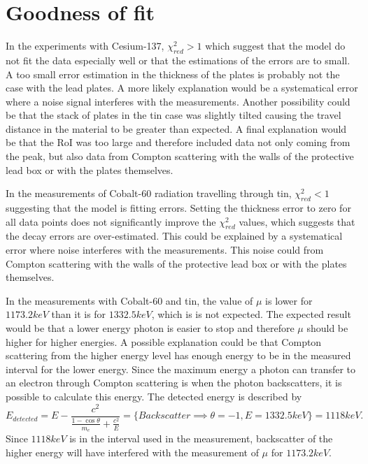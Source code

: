 \documentclass[12pt]{report}
\begin{document}
\section{Goodness of fit}
In the experiments with Cesium-137, $\chi^2_{red} > 1$ which suggest that the model do not fit the data especially well or that the estimations of the errors are to small. A too small error estimation in the thickness of the plates is probably not the case with the lead plates. A more likely explanation would be a systematical error where a noise signal interferes with the measurements. Another possibility could be that the stack of plates in the tin case was slightly tilted causing the travel distance in the material to be greater than expected. A final explanation would be that the RoI was too large and therefore included data not only coming from the peak, but also data from Compton scattering with the walls of the protective lead box or with the plates themselves.

In the measurements of Cobalt-60 radiation travelling through tin, $\chi^2_{red} < 1$ suggesting that the model is fitting errors. Setting the thickness error to zero for all data points does not significantly improve the $\chi^2_{red}$ values, which suggests that the decay errors are over-estimated. This could be explained by a systematical error where noise interferes with the measurements. This noise could from Compton scattering with the walls of the protective lead box or with the plates themselves.

\newpage
In the measurements with Cobalt-60 and tin, the value of $\mu$ is lower for $1173.2keV$ than it is for $1332.5keV$, which is is not expected. The expected result would be that a lower energy photon is easier to stop and therefore $\mu$ should be higher for higher energies. A possible explanation could be that Compton scattering from the higher energy level has enough energy to be in the measured interval for the lower energy. Since the maximum energy a photon can transfer to an electron through Compton scattering is when the photon backscatters, it is possible to calculate this energy. The detected energy is described by
\begin{equation}
    E_{detected} = E - \frac{c^2}{\frac{1 - \cos{\theta}}{m_e} + \frac{c^2}{E}} = \{Backscatter \implies \theta = -1, E = 1332.5keV\} = 1118 keV.
\end{equation}
Since $1118keV$ is in the interval used in the measurement, backscatter of the higher energy will have interfered with the measurement of $\mu$ for $1173.2keV$.
\end{document}
